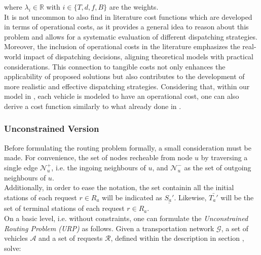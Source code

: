 where $\lambda_i \in \mathbb{R}$ with $i \in \{T, d,f, B\}$ are the weights.\\
It is not uncommon to also find in literature cost functions which are developed in terms of operational costs, as it provides a general idea to reason about this problem and allows for a systematic evaluation of different dispatching strategies. Moreover, the inclusion of operational costs in the literature emphasizes the real-world impact of dispatching decisions, aligning theoretical models with practical considerations. This connection to tangible costs not only enhances the applicability of proposed solutions but also contributes to the development of more realistic and effective dispatching strategies. Considering that, within our model in , each vehicle is modeled to have an operational cost, one can also derive a cost function similarly to what already done in \cite{project_thesis}. 
\subsubsection*{Unconstrained Version}
Before formulating the routing problem formally, a small consideration must be made. For convenience, the set of nodes recheable from node $u$ by traversing a single edge $\mathcal{N}^+_u$, i.e. the ingoing neighbours of $u$, and $\mathcal{N}^-_u$ as the set of outgoing neighbours of $u$.\\ Additionally, in order to ease the notation, the set containin all the initial stations of each request $r \in R_a$ will be indicated as $\underline{S_a'}$. Likewise,  $\bar{T_a'}$ will be the set of terminal stations of each request $r \in R_a$. \\
On a basic level, i.e. without constraints, one can formulate the \textit{Unconstrained Routing Problem (URP)} as follows. Given a transportation network $\mathcal{G}$, a set of vehicles $\mathcal{A}$ and a set of requests $\mathcal{R}$, defined within the description in section , solve:








